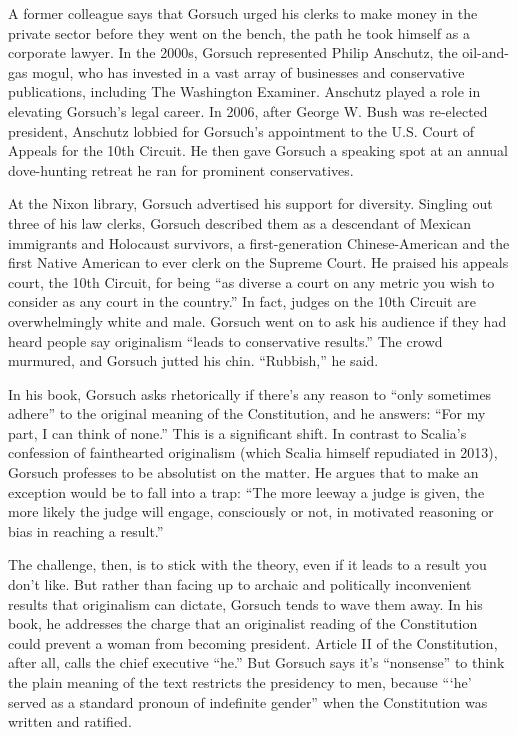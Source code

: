 A former colleague says that Gorsuch urged his clerks to make money in
the private sector before they went on the bench, the path he took
himself as a corporate lawyer. In the 2000s, Gorsuch represented Philip
Anschutz, the oil-and-gas mogul, who has invested in a vast array of
businesses and conservative publications, including The Washington
Examiner. Anschutz played a role in elevating Gorsuch's legal career. In
2006, after George W. Bush was re-elected president, Anschutz lobbied
for Gorsuch's appointment to the U.S. Court of Appeals for the 10th
Circuit. He then gave Gorsuch a speaking spot at an annual dove-hunting
retreat he ran for prominent conservatives.

At the Nixon library, Gorsuch advertised his support for diversity.
Singling out three of his law clerks, Gorsuch described them as a
descendant of Mexican immigrants and Holocaust survivors, a
first-generation Chinese-American and the first Native American to ever
clerk on the Supreme Court. He praised his appeals court, the 10th
Circuit, for being ``as diverse a court on any metric you wish to
consider as any court in the country.'' In fact, judges on the 10th
Circuit are overwhelmingly white and male. Gorsuch went on to ask his
audience if they had heard people say originalism ``leads to
conservative results.'' The crowd murmured, and Gorsuch jutted his chin.
``Rubbish,'' he said.

In his book, Gorsuch asks rhetorically if there's any reason to ``only
sometimes adhere'' to the original meaning of the Constitution, and he
answers: ``For my part, I can think of none.'' This is a significant
shift. In contrast to Scalia's confession of fainthearted originalism
(which Scalia himself repudiated in 2013), Gorsuch professes to be
absolutist on the matter. He argues that to make an exception would be
to fall into a trap: ``The more leeway a judge is given, the more likely
the judge will engage, consciously or not, in motivated reasoning or
bias in reaching a result.''

The challenge, then, is to stick with the theory, even if it leads to a
result you don't like. But rather than facing up to archaic and
politically inconvenient results that originalism can dictate, Gorsuch
tends to wave them away. In his book, he addresses the charge that an
originalist reading of the Constitution could prevent a woman from
becoming president. Article II of the Constitution, after all, calls the
chief executive ``he.'' But Gorsuch says it's ``nonsense'' to think the
plain meaning of the text restricts the presidency to men, because
```he' served as a standard pronoun of indefinite gender'' when the
Constitution was written and ratified.

